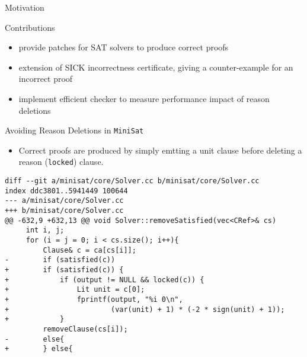 \documentclass[final,hyperref={pdfpagelabels=true}]{beamer}
\begin{document}
\begin{frame}[fragile]
\begin{columns}[t]
\begin{column}{.45\textwidth}
\begin{block}{Motivation}
    \end{block}

    \begin{block}{Contributions}
        \begin{itemize}
		\item provide patches for SAT solvers to produce correct proofs
		\item extension of SICK incorrectness certificate, giving
		a counter-example for an incorrect proof
		\item implement efficient checker to measure performance
		impact of reason deletions
        \end{itemize}
    \end{block}


    \begin{block}{Avoiding Reason Deletions in \texttt{MiniSat}}
	\begin{itemize}
            \item Correct proofs are produced by simply emtting a unit clause
            before deleting a reason (\texttt{locked}) clause.
	\end{itemize}
	\vspace{1cm}
        {\footnotesize
            \begin{verbatim}
diff --git a/minisat/core/Solver.cc b/minisat/core/Solver.cc
index ddc3801..5941449 100644
--- a/minisat/core/Solver.cc
+++ b/minisat/core/Solver.cc
@@ -632,9 +632,13 @@ void Solver::removeSatisfied(vec<CRef>& cs)
     int i, j;
     for (i = j = 0; i < cs.size(); i++){
         Clause& c = ca[cs[i]];
-        if (satisfied(c))
+        if (satisfied(c)) {
+            if (output != NULL && locked(c)) {
+                Lit unit = c[0];
+                fprintf(output, "%i 0\n",
+                        (var(unit) + 1) * (-2 * sign(unit) + 1));
+            }
         removeClause(cs[i]);
-        else{
+        } else{
            \end{verbatim}
        }
    \end{block}
    \end{column}


\end{columns}
\end{frame}
\end{document}
